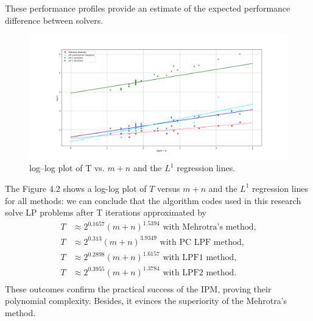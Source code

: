 \documentclass[a4paper,10 pt,titlepage,twoside]{book}
\theoremstyle{plain}
\theoremstyle{definition}
\theoremstyle{remark}
\begin{document}
These performance profiles provide an estimate of the expected performance difference
between solvers.
\begin{figure}\label{figure:T}
	\begin{center}
		\includegraphics[width= 18 cm]{numberiterations}\caption{log–log plot of T vs. $m + n$ and the $L^{1}$ regression lines.}
	\end{center}
\end{figure}
The Figure 4.2 shows a log-log plot of $T$ versus $m + n$ and the $L^{1}$ regression lines for all methods: we can conclude that the algorithm codes used in this research solve LP problems after T iterations approximated by
\begin{align*}
T& \approx 2^{0.1657}(m + n)^{1.5394} \text{ with Mehrotra's method,}\\
T &\approx 2^{0.313}(m + n)^{3.9349} \text{ with PC LPF method,}\\
T& \approx 2^{0.2898}(m + n)^{1.6157} \text{ with LPF1 method,}\\
T& \approx 2^{0.3955}(m + n)^{1.3784} \text{ with LPF2 method.}\\
\end{align*}
These outcomes confirm the practical success of the IPM, proving their polynomial complexity. Besides, it evinces the superiority of the Mehrotra's method. 
%
\end{document}

